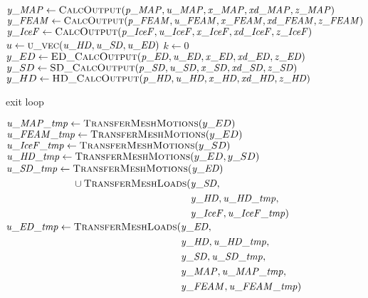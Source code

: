 \documentclass[10pt,letterpaper,oneside,notitlepage]{article}
\begin{document}
\begin{algorithmic}[1]

	\State
	\State $\mathit{y\_MAP}  \gets \Call{CalcOutput}{\mathit{p\_MAP},\mathit{u\_MAP},\mathit{x\_MAP},\mathit{xd\_MAP},\mathit{z\_MAP}}$ 
	\State $\mathit{y\_FEAM} \gets \Call{CalcOutput}{\mathit{p\_FEAM},\mathit{u\_FEAM},\mathit{x\_FEAM},\mathit{xd\_FEAM},\mathit{z\_FEAM}}$
	\State $\mathit{y\_IceF} \gets \Call{CalcOutput}{\mathit{p\_IceF},\mathit{u\_IceF},\mathit{x\_IceF},\mathit{xd\_IceF},\mathit{z\_IceF}}$
	\State
	\State{}
	\State
	\State $u \gets \Call{u\_vec}{\mathit{u\_HD},\mathit{u\_SD},\mathit{u\_ED}}$
	\State $k \gets 0$
	\Loop{}
		\State $y\_ED \gets \Call{ED\_CalcOutput}{\mathit{p\_ED},\mathit{u\_ED},\mathit{x\_ED},\mathit{xd\_ED},\mathit{z\_ED}}$
		\State $y\_SD \gets \Call{SD\_CalcOutput}{\mathit{p\_SD},\mathit{u\_SD},\mathit{x\_SD},\mathit{xd\_SD},\mathit{z\_SD}}$
		\State $y\_HD \gets \Call{HD\_CalcOutput}{\mathit{p\_HD},\mathit{u\_HD},\mathit{x\_HD},\mathit{xd\_HD},\mathit{z\_HD}}$
	
			\State exit loop
		\EndIf
		
		\State$\mathit{u\_MAP\_tmp} \gets \Call{TransferMeshMotions}{y\_ED}$
		\State$\mathit{u\_FEAM\_tmp} \gets \Call{TransferMeshMotions}{y\_ED}$
		\State$\mathit{u\_IceF\_tmp} \gets \Call{TransferMeshMotions}{y\_SD}$
		\State$\mathit{u\_HD\_tmp} \gets \Call{TransferMeshMotions}{y\_ED,y\_SD}$
		\State$\mathit{u\_SD\_tmp} \gets \!
				\begin{aligned}[t]
           & \Call{TransferMeshMotions}{\mathit{y\_ED}}  \\
					 & \cup \Call{TransferMeshLoads}{}(\!
					    \begin{aligned}[t] 
							   & \mathit{y\_SD}, \\
							   & \mathit{y\_HD},\mathit{u\_HD\_tmp}, \\
					       & \mathit{y\_IceF},\mathit{u\_IceF\_tmp}) \\
							\end{aligned}
			\end{aligned}$
		\State$\mathit{u\_ED\_tmp} \gets \Call{TransferMeshLoads}{}( \!
				     \begin{aligned}[t]   & \mathit{y\_ED}, \\
																  & \mathit{y\_HD},  \mathit{u\_HD\_tmp},  \\
																  & \mathit{y\_SD},  \mathit{u\_SD\_tmp},  \\  
																	& \mathit{y\_MAP}, \mathit{u\_MAP\_tmp}, \\ 
																	& \mathit{y\_FEAM},\mathit{u\_FEAM\_tmp} )
							\end{aligned}$


\end{algorithmic}
\end{document}
